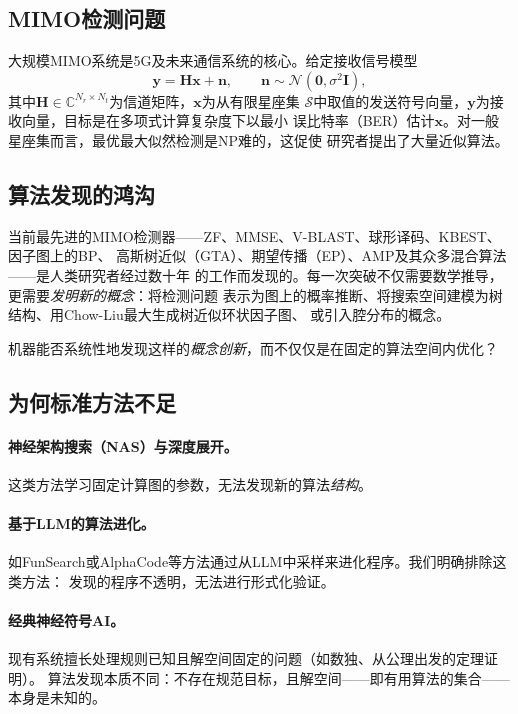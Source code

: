\documentclass[12pt,a4paper]{article}
\newcommand{\bH}{\mathbf{H}}
\newcommand{\bx}{\mathbf{x}}
\newcommand{\by}{\mathbf{y}}
\newcommand{\bn}{\mathbf{n}}
\newcommand{\bI}{\mathbf{I}}
\newcommand{\calN}{\mathcal{N}}
\newcommand{\calS}{\mathcal{S}}
\begin{document}
\subsection{MIMO检测问题}

大规模MIMO系统是5G及未来通信系统的核心。给定接收信号模型
\begin{equation}
  \by = \bH\bx + \bn, \qquad
  \bn \sim \calN(\mathbf{0}, \sigma^2\bI),
  \label{eq:mimo}
\end{equation}
其中$\bH\in\mathbb{C}^{N_r\times N_t}$为信道矩阵，$\bx$为从有限星座集
$\calS$中取值的发送符号向量，$\by$为接收向量，目标是在多项式计算复杂度下以最小
误比特率（BER）估计$\bx$。对一般星座集而言，最优最大似然检测是NP难的，这促使
研究者提出了大量近似算法。

\subsection{算法发现的鸿沟}

当前最先进的MIMO检测器——ZF、MMSE、V-BLAST、球形译码、KBEST、因子图上的BP、
高斯树近似（GTA）、期望传播（EP）、AMP及其众多混合算法——是人类研究者经过数十年
的工作而发现的。每一次突破不仅需要数学推导，更需要\emph{发明新的概念}：将检测问题
表示为图上的概率推断、将搜索空间建模为树结构、用Chow-Liu最大生成树近似环状因子图、
或引入腔分布的概念。

\begin{tcolorbox}[challenge, title={核心挑战}]
  机器能否系统性地发现这样的\emph{概念创新}，而不仅仅是在固定的算法空间内优化？
\end{tcolorbox}

\subsection{为何标准方法不足}

\paragraph{神经架构搜索（NAS）与深度展开。}
这类方法学习固定计算图的参数，无法发现新的算法\emph{结构}。

\paragraph{基于LLM的算法进化。}
如FunSearch或AlphaCode等方法通过从LLM中采样来进化程序。我们明确排除这类方法：
发现的程序不透明，无法进行形式化验证。

\paragraph{经典神经符号AI。}
现有系统擅长处理规则已知且解空间固定的问题（如数独、从公理出发的定理证明）。
算法发现本质不同：不存在规范目标，且解空间——即有用算法的集合——本身是未知的。
\end{document}
